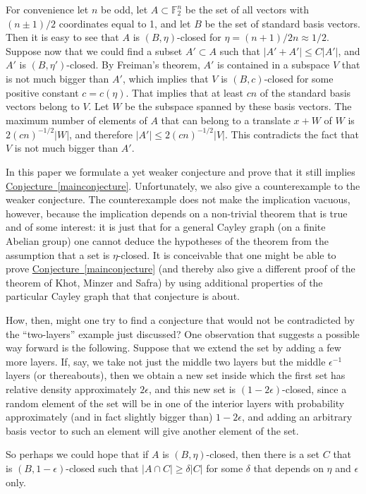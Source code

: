 \documentclass[11pt]{article}
\numberwithin{equation}{section}
\theoremstyle{definition}
\theoremstyle{plain}
\newcommand{\expref}[2]{\hyperref[#2]{#1~\ref{#2}}}
\newcommand\eps{\epsilon}  %
\newcommand\F{\mathbb{F}}
\renewcommand\d{\delta}
\begin{document}
For convenience let $n$ be odd, let $A\subset\F_2^n$ be the set of all vectors with $(n\pm 1)/2$ coordinates equal to 1, and let $B$ be the set of standard basis vectors. Then it is easy to see that $A$ is $(B,\eta)$-closed for $\eta=(n+1)/2n\approx 1/2$. Suppose now that we could find a subset $A'\subset A$ such that $|A'+A'|\leq C|A'|$, and $A'$ is $(B,\eta')$-closed. By Freiman's theorem, $A'$ is contained in a subspace $V$ that is not much bigger than $A'$, which implies that $V$ is $(B,c)$-closed for some positive constant $c=c(\eta)$. That implies that at least $cn$ of the standard basis vectors belong to $V$. Let $W$ be the subspace spanned by these basis vectors. The maximum number of elements of $A$ that can belong to a translate $x+W$ of $W$ is $2(cn)^{-1/2}|W|$, and therefore $|A'|\leq 2(cn)^{-1/2}|V|$. This contradicts the fact that $V$ is not much bigger than $A'$.

In this paper we formulate a yet weaker conjecture and prove that it still implies \expref{Conjecture}{mainconjecture}. Unfortunately, we also give a counterexample to the weaker conjecture. The counterexample does not make the implication 
vacuous, however, because the implication depends on a non-trivial theorem that is true and of some interest: it is just that for a general Cayley graph (on a finite Abelian group) one cannot deduce the hypotheses of the theorem from the assumption that a set is $\eta$-closed. It is conceivable that one might be able to prove \expref{Conjecture}{mainconjecture} (and thereby also give a different proof of the theorem of Khot, Minzer and Safra) by using additional properties of the particular Cayley graph that that conjecture is about.

How, then, might one try to find a conjecture that would not be contradicted by the ``two-layers'' example just discussed? One observation that suggests a possible way forward is the following. Suppose that we extend the set by adding a few more layers. If, say, we take not just the middle two layers but the middle $\eps^{-1}$ layers (or thereabouts), then we obtain a new set inside which the first set has relative density approximately $2\eps$, and this new set is  $(1-2\eps)$-closed, since a random element of the set will be in one of the interior layers with probability approximately (and in fact slightly bigger than) $1-2\eps$, and adding an arbitrary basis vector to such an element will give another element of the set.

So perhaps we could hope that if $A$ is $(B,\eta)$-closed, then there is a set $C$ that is  $(B,1-\eps)$-closed such that $|A\cap C|\geq\d|C|$ for some $\d$ that depends on $\eta$ and $\eps$ only.
\end{document}
